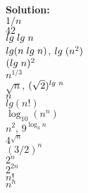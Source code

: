 \documentclass[11pt]{article}
\begin{document}
\begin{enumerate}
    \vspace{0.3cm}\\\textbf{Solution:}
    \\$1/n$
    \\$42$
    \\$lg \hspace{0.1cm}lg\hspace{0.1cm}n$
    \\$lg(n\hspace{0.1 cm} lg\hspace{0.1 cm}n)$, $lg\hspace{0.1 cm} (n^2)$
    \\$(lg \hspace{0.1 cm}n)^2$
    \\$n^{1/3}$
    \\$\sqrt{n}$, $(\sqrt2)^{lg \hspace{0.1 cm} n}$
    \\$n$
    \\$lg(n!)$
    \\$\log _{10} (n^n)$
    \\$n^2$, $9^{\log _{3} n}$
    \\$4^{\sqrt{n}}$
    \\$(3/2)^{n}$
    \\$2^n$
    \\$2^{2n}$
    \\$n!$
    \\$n^{n}$


\end{enumerate}
\end{document}

